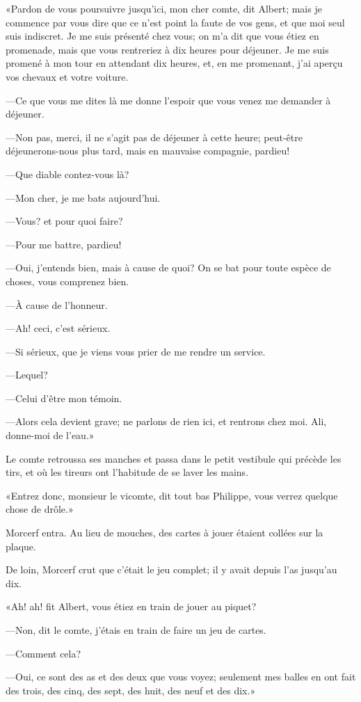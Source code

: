 «Pardon de vous poursuivre jusqu'ici, mon cher comte, dit Albert; mais je commence par vous dire que ce n'est point la faute de vos gens, et que moi seul suis indiscret. Je me suis présenté chez vous; on m'a dit que vous étiez en promenade, mais que vous rentreriez à dix heures pour déjeuner. Je me suis promené à mon tour en attendant dix heures, et, en me promenant, j'ai aperçu vos chevaux et votre voiture. 

—Ce que vous me dites là me donne l'espoir que vous venez me demander à déjeuner. 

—Non pas, merci, il ne s'agit pas de déjeuner à cette heure; peut-être déjeunerons-nous plus tard, mais en mauvaise compagnie, pardieu! 

—Que diable contez-vous là? 

—Mon cher, je me bats aujourd'hui. 

—Vous? et pour quoi faire? 

—Pour me battre, pardieu! 

—Oui, j'entends bien, mais à cause de quoi? On se bat pour toute espèce de choses, vous comprenez bien. 

—À cause de l'honneur. 

—Ah! ceci, c'est sérieux. 

—Si sérieux, que je viens vous prier de me rendre un service. 

—Lequel? 

—Celui d'être mon témoin. 

—Alors cela devient grave; ne parlons de rien ici, et rentrons chez moi. Ali, donne-moi de l'eau.» 

Le comte retroussa ses manches et passa dans le petit vestibule qui précède les tirs, et où les tireurs ont l'habitude de se laver les mains. 

«Entrez donc, monsieur le vicomte, dit tout bas Philippe, vous verrez quelque chose de drôle.» 

Morcerf entra. Au lieu de mouches, des cartes à jouer étaient collées sur la plaque. 

De loin, Morcerf crut que c'était le jeu complet; il y avait depuis l'as jusqu'au dix. 

«Ah! ah! fit Albert, vous étiez en train de jouer au piquet? 

—Non, dit le comte, j'étais en train de faire un jeu de cartes. 

—Comment cela? 

—Oui, ce sont des as et des deux que vous voyez; seulement mes balles en ont fait des trois, des cinq, des sept, des huit, des neuf et des dix.» 

